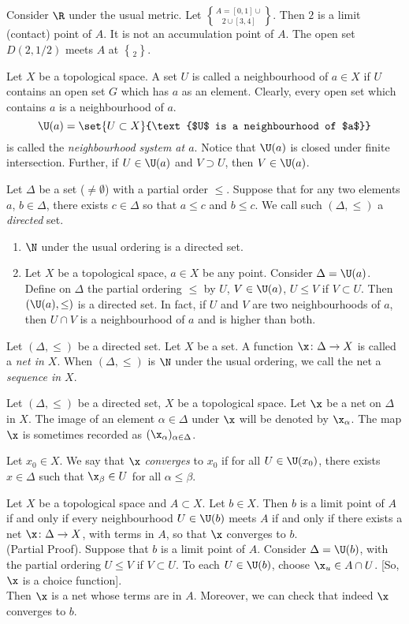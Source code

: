 \eg Consider $\R$ under the usual metric.  Let $A=[0,1]\cup\brace2\cup[3,4]$.  Then $2$ is a limit (contact) point of $A$.  It is not an accumulation point of $A$.  The open set $D(2,1/2)$ meets $A$ at $\brace2$.

 Let $X$ be a topological space.  A set $U$ is called a neighbourhood of $a\in X$ if $U$ contains an open set $G$ which has $a$ as an element.  Clearly, every open set which contains $a$ is a neighbourhood of $a$.
\[ \U(a) = \set{U\subset X}{\text{$U$ is a neighbourhood of $a$}} \]
is called the \emph{neighbourhood system at\/ $a$}.  Notice that $\U(a)$ is closed under finite intersection.  Further, if $U\in\U(a)$ and $V\supset U$, then $V\in\U(a)$.

 Let $\Delta$ be a set ($\neq\emptyset$) with a partial order $\leq$.  Suppose that for any two elements $a$, $b\in\Delta$, there exists $c\in\Delta$ so that $a\leq c$ and $b\leq c$.  We call such $(\Delta,\leq)$ a \emph{directed} set.

\egs
\begin{enumerate}
\item $\N$ under the usual ordering is a directed set.
\item Let $X$ be a topological space, $a\in X$ be any point.  Consider $\Delta=\U(a)$.  Define on $\Delta$ the partial ordering $\leq$ by $U$, $V\in\U(a)$, $U\leq V$ if $V\subset U$.  Then $(\U(a),\leq)$ is a directed set.  In fact, if $U$ and $V$ are two neighbourhoods of $a$, then $U\cap V$ is a neighbourhood of $a$ and is higher than both.
\end{enumerate}
 Let $(\Delta,\leq)$ be a directed set.  Let $X$ be a set.  A function $\x\colon\Delta\to X$ is called a \emph{net in\/ $X$}.  When $(\Delta,\leq)$ is $\N$ under the usual ordering, we call the net a \emph{sequence in\/ $X$}.

 Let $(\Delta,\leq)$ be a directed set, $X$ be a topological space.  Let $\x$ be a net on $\Delta$ in $X$.  The image of an element $\alpha\in\Delta$ under $\x$ will be denoted by $\x_\alpha$.  The map $\x$ is sometimes recorded as $(\x_\alpha)_{\alpha\in\Delta}$.

Let $x_0\in X$.  We say that $\x$ \emph{converges} to $x_0$ if for all $U\in\U(x_0)$, there exists $x\in\Delta$ such that $\x_\beta\in U$ for all $\alpha\leq\beta$.

\prop Let $X$ be a topological space and $A\subset X$.  Let $b\in X$.  Then $b$ is a limit point of $A$ if and only if every neighbourhood $U\in\U(b)$ meets $A$ if and only if there exists a net $\x\colon\Delta\to X$, with terms in $A$, so that $\x$ converges to $b$. \\
(Partial Proof).  Suppose that $b$ is a limit point of $A$.  Consider $\Delta=\U(b)$, with the partial ordering $U\leq V$ if $V\subset U$.  To each $U\in\U(b)$, choose $\x_u\in A\cap U$. [So, $\x$ is a choice function]. \\
Then $\x$ is a net whose terms are in $A$.  Moreover, we can check that indeed $\x$ converges to $b$.
